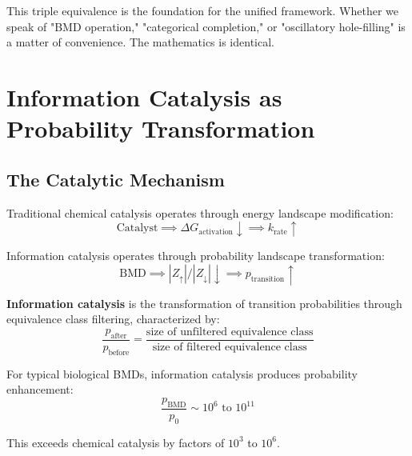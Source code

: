 \begin{remark}
This triple equivalence is the foundation for the unified framework. Whether we speak of "BMD operation," "categorical completion," or "oscillatory hole-filling" is a matter of convenience. The mathematics is identical.
\end{remark}

\section{Information Catalysis as Probability Transformation}

\subsection{The Catalytic Mechanism}

Traditional chemical catalysis operates through energy landscape modification:
\begin{equation}
\text{Catalyst} \implies \Delta G_{\text{activation}} \downarrow \implies k_{\text{rate}} \uparrow
\end{equation}

Information catalysis operates through probability landscape transformation:
\begin{equation}
\text{BMD} \implies |Z_{\uparrow}|/|Z_{\downarrow}| \downarrow \implies p_{\text{transition}} \uparrow
\end{equation}

\begin{definition}
\label{def:info_catalysis}
\textbf{Information catalysis} is the transformation of transition probabilities through equivalence class filtering, characterized by:
\begin{equation}
\frac{p_{\text{after}}}{p_{\text{before}}} = \frac{\text{size of unfiltered equivalence class}}{\text{size of filtered equivalence class}}
\end{equation}
\end{definition}

\begin{theorem}
\label{thm:info_cat_magnitude}
For typical biological BMDs, information catalysis produces probability enhancement:
\begin{equation}
\frac{p_{\text{BMD}}}{p_0} \sim 10^6 \text{ to } 10^{11}
\end{equation}

This exceeds chemical catalysis by factors of $10^3$ to $10^6$.
\end{theorem}

